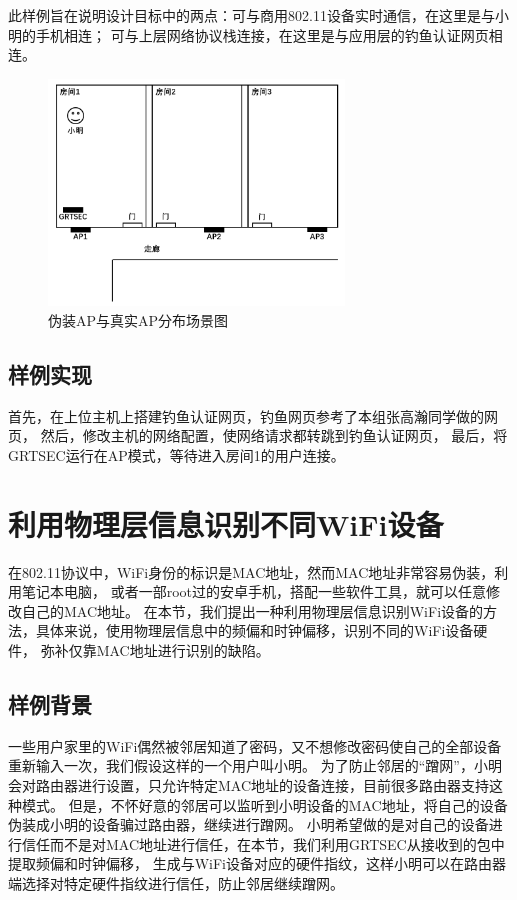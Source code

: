 		此样例旨在说明设计目标中的两点：可与商用802.11设备实时通信，在这里是与小明的手机相连；
		可与上层网络协议栈连接，在这里是与应用层的钓鱼认证网页相连。

			\begin{figure}
				\centering
				\includegraphics[width=0.7\textwidth]{img/demo_fake_wifi_scenary.png}
				\caption{伪装AP与真实AP分布场景图}
				\label{fig:demo_fake_wifi_scenary}
			\end{figure}

		\subsection{样例实现}
		首先，在上位主机上搭建钓鱼认证网页，钓鱼网页参考了本组张高瀚同学做的网页\cite{zgh17wifi}，
		然后，修改主机的网络配置，使网络请求都转跳到钓鱼认证网页，
		最后，将GRTSEC运行在AP模式，等待进入房间1的用户连接。

	\section{利用物理层信息识别不同WiFi设备}\label{sec:demo_phy_auth}
	在802.11协议中，WiFi身份的标识是MAC地址，然而MAC地址非常容易伪装，利用笔记本电脑，
	或者一部root过的安卓手机，搭配一些软件工具，就可以任意修改自己的MAC地址\cite{NetworkSecurity11hacking}。
	在本节，我们提出一种利用物理层信息识别WiFi设备的方法，具体来说，使用物理层信息中的频偏和时钟偏移，识别不同的WiFi设备硬件，
	弥补仅靠MAC地址进行识别的缺陷。

		\subsection{样例背景}\label{subsec:demo_trusted_sta}
		一些用户家里的WiFi偶然被邻居知道了密码，又不想修改密码使自己的全部设备重新输入一次，我们假设这样的一个用户叫小明。
		为了防止邻居的“蹭网”，小明会对路由器进行设置，只允许特定MAC地址的设备连接，目前很多路由器支持这种模式。
		但是，不怀好意的邻居可以监听到小明设备的MAC地址，将自己的设备伪装成小明的设备骗过路由器，继续进行蹭网。
		小明希望做的是对自己的设备进行信任而不是对MAC地址进行信任，在本节，我们利用GRTSEC从接收到的包中提取频偏和时钟偏移，
		生成与WiFi设备对应的硬件指纹，这样小明可以在路由器端选择对特定硬件指纹进行信任，防止邻居继续蹭网。

